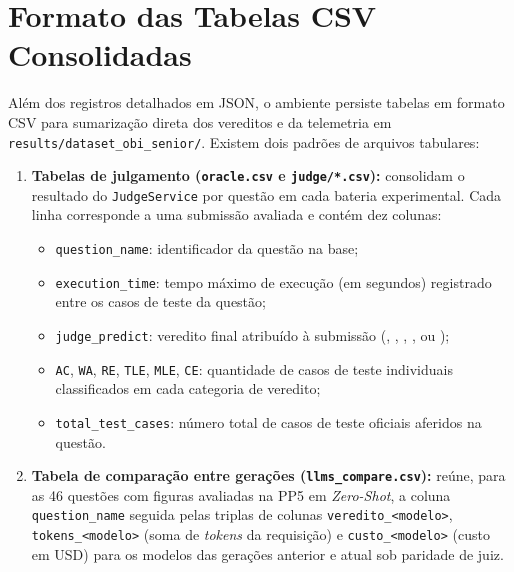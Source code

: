 \section{Formato das Tabelas CSV Consolidadas}\label{ap:esquema-csv}

Além dos registros detalhados em JSON, o ambiente persiste tabelas em formato CSV para sumarização direta dos vereditos e da telemetria em \texttt{results/\allowbreak dataset\_obi\_senior/}. Existem dois padrões de arquivos tabulares:

\begin{enumerate}
    \item \textbf{Tabelas de julgamento (\texttt{oracle.csv} e \texttt{judge/*.csv}):} consolidam o resultado do \texttt{JudgeService} por questão em cada bateria experimental. Cada linha corresponde a uma submissão avaliada e contém dez colunas:
    \begin{itemize}
        \item \texttt{question\_name}: identificador da questão na base;
        \item \texttt{execution\_time}: tempo máximo de execução (em segundos) registrado entre os casos de teste da questão;
        \item \texttt{judge\_predict}: veredito final atribuído à submissão (, , , ,  ou );
        \item \texttt{AC}, \texttt{WA}, \texttt{RE}, \texttt{TLE}, \texttt{MLE}, \texttt{CE}: quantidade de casos de teste individuais classificados em cada categoria de veredito;
        \item \texttt{total\_test\_cases}: número total de casos de teste oficiais aferidos na questão.
    \end{itemize}
    \item \textbf{Tabela de comparação entre gerações (\texttt{llms\_compare.csv}):} reúne, para as 46 questões com figuras avaliadas na PP5 em  \textit{Zero-Shot}, a coluna \texttt{question\_name} seguida pelas triplas de colunas \texttt{veredito\_<modelo>}, \texttt{tokens\_<modelo>} (soma de \textit{tokens} da requisição) e \texttt{custo\_<modelo>} (custo em USD) para os modelos das gerações anterior e atual sob paridade de juiz.
\end{enumerate}
